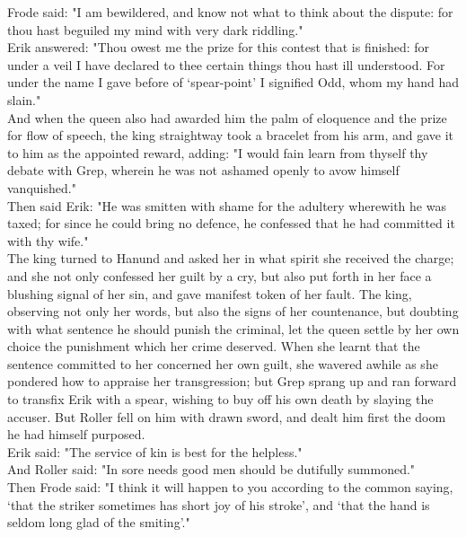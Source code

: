 \documentclass[10pt,a4paper]{report}
\begin{document}
Frode said: "I am bewildered, and know not what to think about the dispute: for thou hast beguiled my mind with very dark riddling."\\

Erik answered: "Thou owest me the prize for this contest that is finished: for under a veil I have declared to thee certain things thou hast ill understood. For under the name I gave before of `spear-point' I signified Odd, whom my hand had slain."\\

And when the queen also had awarded him the palm of eloquence and the prize for flow of speech, the king straightway took a bracelet from his arm, and gave it to him as the appointed reward, adding: "I would fain learn from thyself thy debate with Grep, wherein he was not ashamed openly to avow himself vanquished."\\

Then said Erik: "He was smitten with shame for the adultery wherewith he was taxed; for since he could bring no defence, he confessed that he had committed it with thy wife."\\

The king turned to Hanund and asked her in what spirit she received the charge; and she not only confessed her guilt by a cry, but also put forth in her face a blushing signal of her sin, and gave manifest token of her fault. The king, observing not only her words, but also the signs of her countenance, but doubting with what sentence he should punish the criminal, let the queen settle by her own choice the punishment which her crime deserved. When she learnt that the sentence committed to her concerned her own guilt, she wavered awhile as she pondered how to appraise her transgression; but Grep sprang up and ran forward to transfix Erik with a spear, wishing to buy off his own death by slaying the accuser. But Roller fell on him with drawn sword, and dealt him first the doom he had himself purposed.\\

Erik said: "The service of kin is best for the helpless."\\

And Roller said: "In sore needs good men should be dutifully summoned."\\

Then Frode said: "I think it will happen to you according to the common saying, `that the striker sometimes has short joy of his stroke', and `that the hand is seldom long glad of the smiting'."\\
\end{document}
